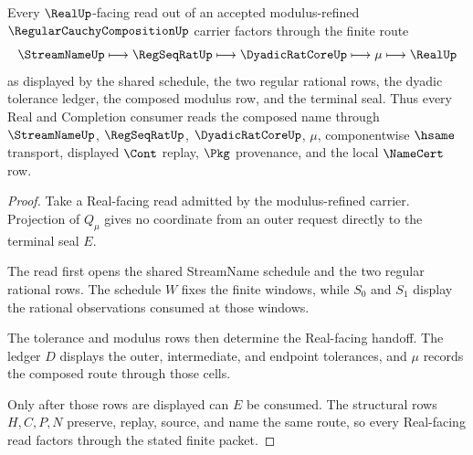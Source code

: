 \begin{theorem}\label{thm:regular-cauchy-composition-modulus-real-handoff}
Every $\RealUp$-facing read out of an accepted modulus-refined $\RegularCauchyCompositionUp$ carrier factors through the finite route
$$
\StreamNameUp \longmapsto \RegSeqRatUp \longmapsto \DyadicRatCoreUp \longmapsto \mu \longmapsto \RealUp
$$
as displayed by the shared schedule, the two regular rational rows, the dyadic tolerance ledger, the composed modulus row, and the terminal seal. Thus every Real and Completion consumer reads the composed name through $\StreamNameUp$, $\RegSeqRatUp$, $\DyadicRatCoreUp$, $\mu$, componentwise $\hsame$ transport, displayed $\Cont$ replay, $\Pkg$ provenance, and the local $\NameCert$ row.
\end{theorem}
\begin{proof}
Take a Real-facing read admitted by the modulus-refined carrier. Projection of $Q_\mu$ gives no coordinate from an outer request directly to the terminal seal $E$.

The read first opens the shared StreamName schedule and the two regular rational rows. The schedule $W$ fixes the finite windows, while $S_0$ and $S_1$ display the rational observations consumed at those windows.

The tolerance and modulus rows then determine the Real-facing handoff. The ledger $D$ displays the outer, intermediate, and endpoint tolerances, and $\mu$ records the composed route through those cells.

Only after those rows are displayed can $E$ be consumed. The structural rows $H,C,P,N$ preserve, replay, source, and name the same route, so every Real-facing read factors through the stated finite packet.
\end{proof}

